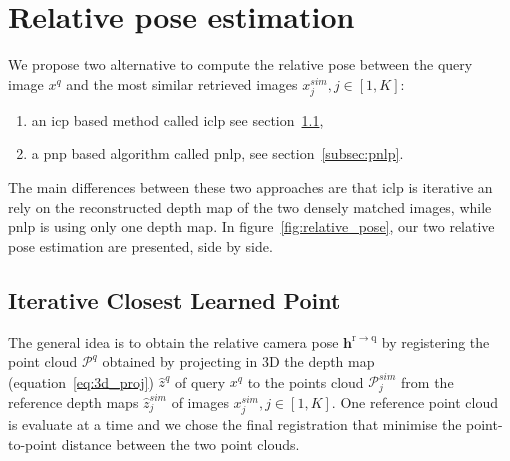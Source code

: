 \section{Relative pose estimation}


\label{sec:relative_pose}
We propose two alternative to compute the relative pose between the query image $x^q$ and the most similar retrieved images $x^{sim}_j, j \in [1, K]$:
\begin{enumerate}
	\item an \ac{icp} based method called \ac{iclp} see section~\ref{subsec:pc_alignment},
	\item a \ac{pnp} based algorithm called \ac{pnlp}, see section~\ref{subsec:pnlp}.
\end{enumerate}
\noindent The main differences between these two approaches are that \ac{iclp} is iterative an rely on the reconstructed depth map of the two densely matched images, while \ac{pnlp} is using only one depth map. In figure~\ref{fig:relative_pose}, our two relative pose estimation are presented, side by side.

\subsection{Iterative Closest Learned Point}
\label{subsec:pc_alignment}

The general idea is to obtain the relative camera pose $\mathbf{h}^\mathrm{r \rightarrow q}$ by registering the point cloud $\mathcal{P}^q$ obtained by projecting in 3D the depth map (equation~\ref{eq:3d_proj}) $\hat{z}^q$ of query $x^q$ to the points cloud $\mathcal{P}^{sim}_j$ from the reference depth maps $\hat{z}^{sim}_j$ of images $x^{sim}_j, j \in [1, K]$. One reference point cloud is evaluate at a time and we chose the final registration that minimise the point-to-point distance between the two point clouds.

